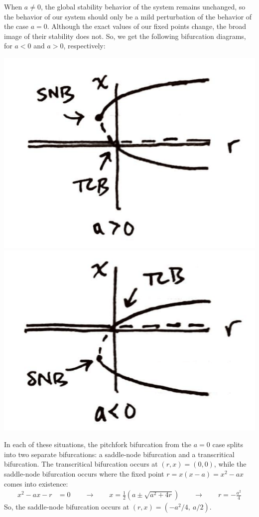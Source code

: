 \documentclass[10pt,letterpaper]{report}
\newcommand{\so}{\qquad \rightarrow \qquad}
\begin{document}
\begin{enumerate}
\begin{enumerate}
    When $a \ne 0$, the global stability behavior of the system remains unchanged, so the behavior of our system should only be a mild perturbation of the behavior of the case $a = 0$. Although the exact values of our fixed points change, the broad image of their stability does not. So, we get the following bifurcation diagrams, for $a < 0$ and $a > 0$, respectively:
    \begin{center}
        \includegraphics[height=0.2\textwidth]{img/2020F1a3.png}
        \qquad
        \includegraphics[height=0.2\textwidth]{img/2020F1a4.png}
    \end{center}
    In each of these situations, the pitchfork bifurcation from the $a = 0$ case splits into two separate bifurcations: a saddle-node bifurcation and a transcritical bifurcation. The transcritical bifurcation occurs at $(r, x) = (0, 0)$, while the saddle-node bifurcation occurs where the fixed point $r = x(x- a) = x^2 - ax$ comes into existence:
    \begin{align*}
    x^2 - ax - r &= 0
    \so
    x = \frac{1}{2}\left(a \pm \sqrt{a^2 + 4r}\right) \so
    r = -\frac{a^2}{4}
    \end{align*}
    So, the saddle-node bifurcation occurs at $(r, x) = \left(-a^2/4,\ a/2\right)$.
    

\end{enumerate}
\end{enumerate}
\end{document}
